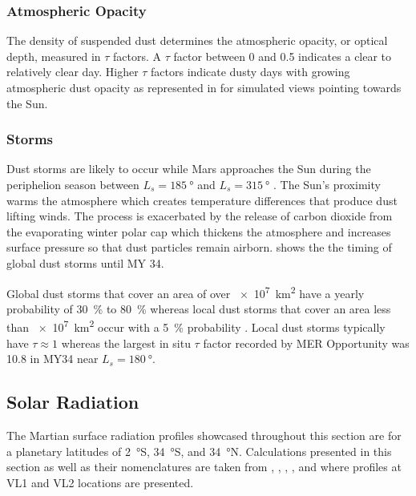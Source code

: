 \subsubsection{Atmospheric Opacity}
\label{sec:MartianEnvironment:Dust:AtmosphericOpacity}
The density of suspended dust determines the atmospheric opacity, or optical depth, measured in $\tau$ factors. A $\tau$ factor between 0 and 0.5 indicates a clear to relatively clear day. Higher $\tau$ factors indicate dusty days with growing atmospheric dust opacity as represented in  for simulated views pointing towards the Sun. %

\subsubsection{Storms}
\label{sec:MartianEnvironment:Dust:Storms}

Dust storms are likely to occur while Mars approaches the Sun during the periphelion season between $L_{s} = \SI{185}{\degree}$ and $L_{s} = \SI{315}{\degree}$ . The Sun's proximity warms the atmosphere which creates temperature differences that produce dust lifting winds. The process is exacerbated by the release of carbon dioxide from the evaporating winter polar cap which thickens the atmosphere and increases surface pressure so that dust particles remain airborn.  shows the the timing of global dust storms until \ac{MY} 34.

Global dust storms that cover an area of over \SI{e7}{\kilo\meter\squared} have a yearly probability of \SI{30}{\percent} to \SI{80}{\percent} whereas local dust storms that cover an area less than \SI{e7}{\kilo\meter\squared} occur with a \SI{5}{\percent} probability . Local dust storms typically have $\tau \approx 1$  whereas the largest in situ $\tau$ factor recorded by \ac{MER} Opportunity was 10.8 in \ac{MY}34 near $L_{s} = \SI{180}{\degree}$.

\subsection{Solar Radiation}
\label{sec:MartianEnvironment:SolarRadiation}

The Martian surface radiation profiles showcased throughout this section are for a planetary latitudes of \SI{2}{\degree}S, \SI{34}{\degree}S, and \SI{34}{\degree}N. Calculations presented in this section as well as their nomenclatures are taken from , , , , and  where profiles at \ac{VL1} and \ac{VL2} locations are presented.

